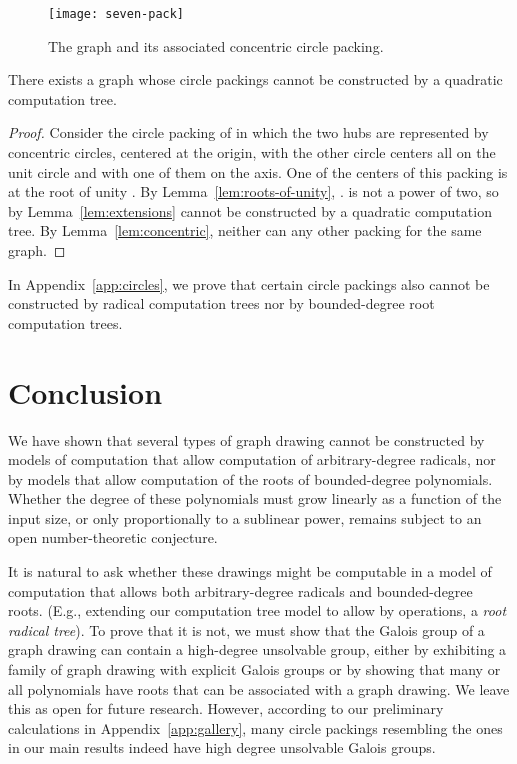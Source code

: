 \documentclass[oribibl,10pt]{llncs}
\begin{document}
\begin{figure}[t]
\centering
\vspace*{-2pt}
\texttt{[image: seven-pack]}
\vspace*{-4pt}
\caption{\label{fig:seven-pack} The graph  and its associated concentric circle packing.}
\end{figure}

\begin{theorem}
\label{thm:no-quadratic}
There exists a graph whose circle packings cannot be constructed by a quadratic computation tree.
\end{theorem}

\begin{proof}
Consider the circle packing of  in which the two hubs are represented by concentric circles,
centered at the origin, with the other circle centers all on the unit circle and with one of them on the  axis. One of the centers of this packing is at the root of unity . By Lemma~\ref{lem:roots-of-unity},
.
 is not a power of two, so by Lemma~\ref{lem:extensions}  cannot be constructed by a quadratic computation tree. By Lemma~\ref{lem:concentric}, neither can any other packing for the same graph.
\end{proof}

In Appendix~\ref{app:circles}, we prove that certain circle packings also cannot be constructed by radical computation trees
nor by
bounded-degree root computation trees.

\section{Conclusion}
We have shown that several types of graph drawing cannot be constructed by models of computation that allow computation of arbitrary-degree radicals, nor by models that allow computation of the roots of bounded-degree polynomials. Whether the degree of these polynomials must grow linearly as a function of the input size, or only proportionally to a sublinear power, remains subject to an open number-theoretic conjecture.

It is natural to ask whether these drawings might be computable in a model of computation that allows both arbitrary-degree radicals and bounded-degree roots.
\ifFull
(E.g., extending our computation tree model to allow by operations, a \emph{root radical tree}).
To prove that it is not, we must show that the Galois group of a graph drawing can contain a high-degree unsolvable group, either by exhibiting a family of graph drawing with explicit Galois groups
or by showing that many or all polynomials have roots that can be associated with a graph drawing. 
\fi
We leave this as open for future research.
\ifFull
However, according to our preliminary calculations in Appendix~\ref{app:gallery}, many circle packings resembling the ones in our main results indeed have high degree unsolvable Galois groups.
\end{document}
